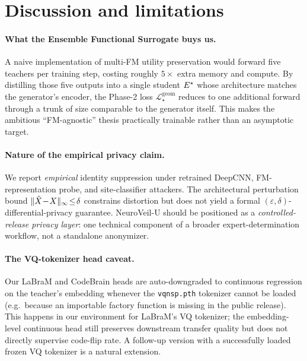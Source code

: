 \section{Discussion and limitations}
\label{sec:discussion}

\paragraph{What the Ensemble Functional Surrogate buys us.} A naive implementation of multi-FM utility preservation would forward five teachers per training step, costing roughly $5\times$ extra memory and compute. By distilling those five outputs into a single student $E^{\star}$ whose architecture matches the generator's encoder, the Phase-2 loss $\mathcal{L}_\star^{\text{geom}}$ reduces to one additional forward through a trunk of size comparable to the generator itself. This makes the ambitious ``FM-agnostic'' thesis practically trainable rather than an asymptotic target.

\paragraph{Nature of the empirical privacy claim.} We report \emph{empirical} identity suppression under retrained DeepCNN, FM-representation probe, and site-classifier attackers. The architectural perturbation bound $\|\tilde{X}\!-\!X\|_\infty\!\le\!\delta$ constrains distortion but does not yield a formal $(\varepsilon,\delta)$-differential-privacy guarantee. NeuroVeil-U should be positioned as a \emph{controlled-release privacy layer}: one technical component of a broader expert-determination workflow, not a standalone anonymizer.

\paragraph{The VQ-tokenizer head caveat.} Our LaBraM and CodeBrain heads are auto-downgraded to continuous regression on the teacher's embedding whenever the \texttt{vqnsp.pth} tokenizer cannot be loaded (e.g.\ because an importable factory function is missing in the public release). This happens in our environment for LaBraM's VQ tokenizer; the embedding-level continuous head still preserves downstream transfer quality but does not directly supervise code-flip rate. A follow-up version with a successfully loaded frozen VQ tokenizer is a natural extension.

